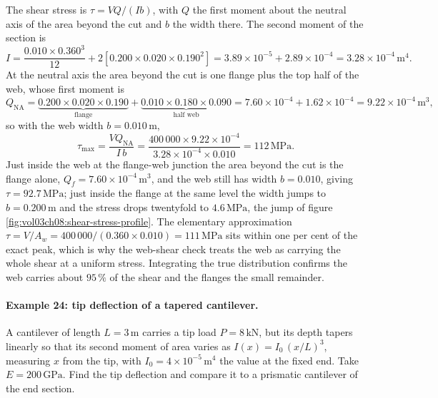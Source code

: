 The shear stress is $\tau = VQ/(Ib)$, with $Q$ the first moment about
the neutral axis of the area beyond the cut and $b$ the width there. The
second moment of the section is
\[
I = \frac{0.010 \times 0.360^3}{12}
+ 2 \left[0.200 \times 0.020 \times 0.190^2\right]
= 3.89 \times 10^{-5} + 2.89 \times 10^{-4}
= 3.28 \times 10^{-4}\,\si{\meter\tothe{4}}.
\]
At the neutral axis the area beyond the cut is one flange plus the top
half of the web, whose first moment is
\[
Q_{\text{NA}} = \underbrace{0.200 \times 0.020 \times 0.190}_{\text{flange}}
+ \underbrace{0.010 \times 0.180 \times 0.090}_{\text{half web}}
= 7.60 \times 10^{-4} + 1.62 \times 10^{-4} = 9.22 \times 10^{-4}\,
\si{\meter\cubed},
\]
so with the web width $b = 0.010\,\si{\meter}$,
\[
\tau_{\max} = \frac{V Q_{\text{NA}}}{I\,b}
= \frac{400\,000 \times 9.22 \times 10^{-4}}
{3.28 \times 10^{-4} \times 0.010} = 112\,\text{MPa}.
\]
Just inside the web at the flange-web junction the area beyond the cut
is the flange alone, $Q_f = 7.60 \times 10^{-4}\,\si{\meter\cubed}$, and
the web still has width $b = 0.010$, giving $\tau = 92.7\,\text{MPa}$;
just inside the flange at the same level the width jumps to $b =
0.200\,\si{\meter}$ and the stress drops twentyfold to $4.6\,\text{MPa}$,
the jump of figure \ref{fig:vol03ch08:shear-stress-profile}. The
elementary approximation $\tau = V/A_w = 400\,000/(0.360 \times 0.010) =
111\,\text{MPa}$ sits within one per cent of the exact peak, which is
why the web-shear check treats the web as carrying the whole shear at a
uniform stress. Integrating the true distribution confirms the web
carries about $95\,\%$ of the shear and the flanges the small remainder.



\paragraph{Example 24: tip deflection of a tapered cantilever.} A
cantilever of length $L = 3\,\si{\meter}$ carries a tip load $P =
8\,\text{kN}$, but its depth tapers linearly so that its second moment
of area varies as $I(x) = I_0\,(x/L)^3$, measuring $x$ from the tip,
with $I_0 = 4 \times 10^{-5}\,\si{\meter\tothe{4}}$ the value at the
fixed end. Take $E = 200\,\text{GPa}$. Find the tip deflection and
compare it to a prismatic cantilever of the end section.

